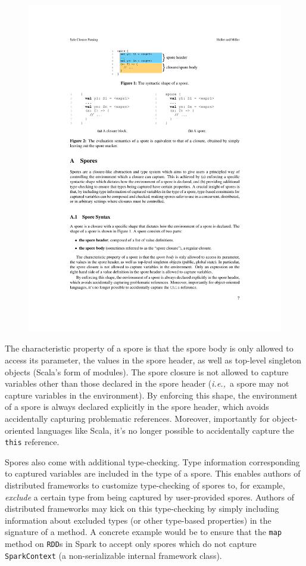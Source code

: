 \documentclass[preprint]{sigplanconf}
\theoremstyle{definition}
\theoremstyle{definition}
\newcommand{\ie}{{\em i.e.,~}}
\begin{document}
\vspace{-1mm}
\begin{figure}[h!]
\centering\includegraphics[width=0.75\columnwidth]{spore-shape.pdf}
\end{figure}
\vspace{-1mm}

The characteristic property of a spore is that the spore body is only allowed
to access its parameter, the values in the spore header, as well as top-level
singleton objects (Scala's form of modules). The spore closure is not allowed
to capture variables other than those declared in the spore header (\ie a
spore may not capture variables in the environment). By enforcing this shape,
the environment of a spore is always declared explicitly in the spore header,
which avoids accidentally capturing problematic references. Moreover,
importantly for object-oriented languages like Scala, it's no longer possible
to accidentally capture the \verb|this| reference.

Spores also come with additional type-checking. Type information corresponding
to captured variables are included in the type of a spore. This enables
authors of distributed frameworks to customize type-checking of spores to, for
example, {\em exclude} a certain type from being captured by user-provided
spores. Authors of distributed frameworks may kick on this type-checking by
simply including information about excluded types (or other type-based
properties) in the signature of a method. A concrete example would be to
ensure that the \verb|map| method on \verb|RDD|s in Spark to accept only
spores which do not capture \verb|SparkContext| (a non-serializable internal
framework class).
\end{document}
